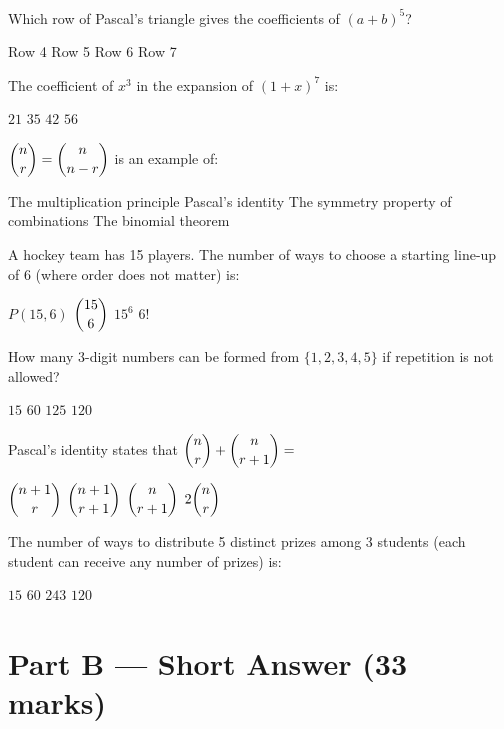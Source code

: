 \documentclass[addpoints]{exam}
\begin{document}
\begin{questions}
\question[1] Which row of Pascal's triangle gives the coefficients of $(a+b)^5$?
\begin{choices}
    \choice Row 4
    \correctchoice Row 5
    \choice Row 6
    \choice Row 7
\end{choices}

\question[1] The coefficient of $x^3$ in the expansion of $(1+x)^7$ is:
\begin{choices}
    \choice $21$
    \correctchoice $35$
    \choice $42$
    \choice $56$
\end{choices}

\question[1] $\dbinom{n}{r} = \dbinom{n}{n-r}$ is an example of:
\begin{choices}
    \choice The multiplication principle
    \choice Pascal's identity
    \correctchoice The symmetry property of combinations
    \choice The binomial theorem
\end{choices}

\question[1] A hockey team has 15 players. The number of ways to choose a starting line-up
of 6 (where order does not matter) is:
\begin{choices}
    \choice $P(15,6)$
    \correctchoice $\dbinom{15}{6}$
    \choice $15^6$
    \choice $6!$
\end{choices}

\question[1] How many 3-digit numbers can be formed from $\{1,2,3,4,5\}$ if repetition is
not allowed?
\begin{choices}
    \choice $15$
    \correctchoice $60$
    \choice $125$
    \choice $120$
\end{choices}

\question[1] Pascal's identity states that $\dbinom{n}{r} + \dbinom{n}{r+1} =$
\begin{choices}
    \choice $\dbinom{n+1}{r}$
    \correctchoice $\dbinom{n+1}{r+1}$
    \choice $\dbinom{n}{r+1}$
    \choice $2\dbinom{n}{r}$
\end{choices}

\question[1] The number of ways to distribute 5 distinct prizes among 3 students (each student
can receive any number of prizes) is:
\begin{choices}
    \choice $15$
    \choice $60$
    \correctchoice $243$
    \choice $120$
\end{choices}


\section*{Part B --- Short Answer (33 marks)}


\end{questions}
\end{document}
